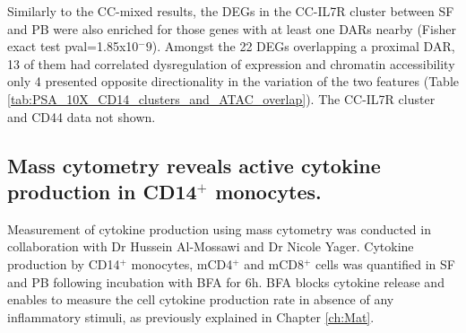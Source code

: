 Similarly to the CC-mixed results, the DEGs in the CC-IL7R cluster between SF and PB were also enriched for those genes with at least one DARs nearby (Fisher exact test pval=1.85x10$^-9$). Amongst the 22 DEGs overlapping a proximal DAR, 13 of them had correlated dysregulation of expression and chromatin accessibility only 4 presented opposite directionality in the variation of the two features (Table \ref{tab:PSA_10X_CD14_clusters_and_ATAC_overlap}). The CC-IL7R cluster and CD44 data not shown.






\subsection{Mass cytometry reveals active cytokine production in CD14$^+$ monocytes.}
Measurement of cytokine production using mass cytometry was conducted in collaboration with Dr Hussein Al-Mossawi and Dr Nicole Yager. Cytokine production by CD14$^+$ monocytes, mCD4$^+$ and mCD8$^+$ cells was quantified in SF and PB following incubation with BFA for 6h. BFA blocks cytokine release and enables to measure the cell cytokine production rate in absence of any inflammatory stimuli, as previously explained in Chapter \ref{ch:Mat}. 


